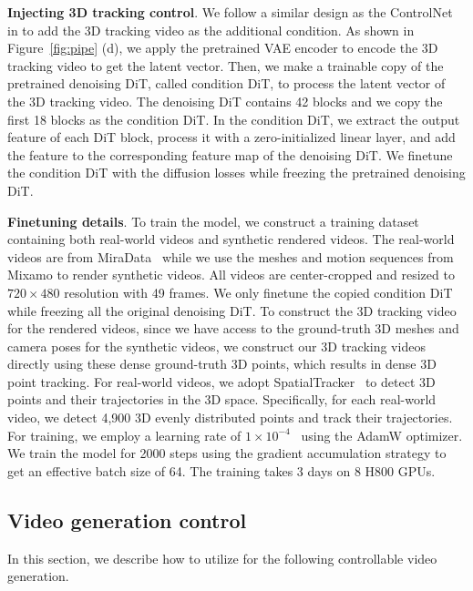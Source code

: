 \textbf{Injecting 3D tracking control}. We follow a similar design as the ControlNet~\cite{zhang2023adding,chen2025pixart} in \methodname to add the 3D tracking video as the additional condition. As shown in Figure~\ref{fig:pipe} (d), we apply the pretrained VAE encoder to encode the 3D tracking video to get the latent vector. Then, we make a trainable copy of the pretrained denoising DiT, called condition DiT, to process the latent vector of the 3D tracking video. The denoising DiT contains 42 blocks and we copy the first 18 blocks as the condition DiT. In the condition DiT, we extract the output feature of each DiT block, process it with a zero-initialized linear layer, and add the feature to the corresponding feature map of the denoising DiT. We finetune the condition DiT with the diffusion losses while freezing the pretrained denoising DiT. 


\textbf{Finetuning details}.
To train the \methodname model, we construct a training dataset containing both real-world videos and synthetic rendered videos. The real-world videos are from MiraData~\cite{ju2024miradatalargescalevideodataset} while we use the meshes and motion sequences from Mixamo to render synthetic videos. All videos are center-cropped and resized to $720 \times 480$ resolution with 49 frames. 
We only finetune the copied condition DiT while freezing all the original denoising DiT.
To construct the 3D tracking video for the rendered videos, since we have access to the ground-truth 3D meshes and camera poses for the synthetic videos, we construct our 3D tracking videos directly using these dense ground-truth 3D points, which results in dense 3D point tracking. For real-world videos, we adopt SpatialTracker~\cite{xiao2024spatialtracker} to detect 3D points and their trajectories in the 3D space. Specifically, for each real-world video, we detect 4,900 3D evenly distributed points and track their trajectories. For training, we employ a learning rate of $1\times 10^{-4}$ \ using the AdamW optimizer. We train the model for 2000 steps using the gradient accumulation strategy to get an effective batch size of 64. The training takes 3 days on 8 H800 GPUs. 




\subsection{Video generation control}
\label{sec:control}
In this section, we describe how to utilize \methodname for the following controllable video generation.

